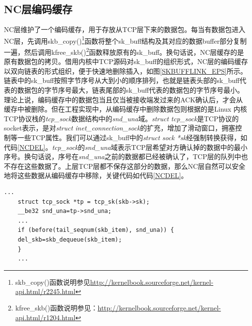 \subsection{NC层编码缓存}
NC层维护了一个编码缓存，用于存放从TCP层下来的数据包。每当有数据包进入NC层，先调用skb\_copy()\footnote{skb\_copy()函数说明参见\url{http://kernelbook.sourceforge.net/kernel-api.html/r2245.html}}函数将整个sk\_buff结构及其对应的数据buffer部分复制一遍，然后调用kfree\_skb()\footnote{kfree\_skb()函数说明参见：\url{http://kernelbook.sourceforge.net/kernel-api.html/r1204.html}}函数释放原有的sk\_buff。换句话说，NC层缓存的是原有数据包的拷贝。借用内核中TCP源码对sk\_buff的组织形式，NC层的编码缓存以双向链表的形式组织，便于快速地删除插入，如图\ref{SKBUFFLINK_EPS}所示。链表中的sk\_buff按照字节序号从大到小的顺序排列，也就是链表头部的sk\_buff代表的数据包的字节序号最大，链表尾部的sk\_buff代表的数据包的字节序号最小。理论上说，编码缓存中的数据包当且仅当被接收端发过来的ACK确认后，才会从缓存中被删除。但在工程实现中，从编码缓存中删除数据包则根据的是Linux 内核TCP协议栈的\emph{tcp\_sock}数据结构中的\emph{snd\_una}域。\emph{struct tcp\_sock}是TCP协议的socket表示，是对\emph{struct inet\_connection\_sock}的扩充，增加了滑动窗口，拥塞控制等一些TCP属性。我们可以通过sk\_buff中的\emph{struct sock *sk}经强制转换获得，如代码\ref{NCDEL}。\emph{tcp\_sock}的\emph{snd\_una}域表示TCP层希望对方确认掉的数据中的最小序号。换句话说，序号在\emph{snd\_una}之前的数据都已经被确认了，TCP层的队列中也不存在这些数据了。上层TCP层都不保存这部分的数据，那么NC层自然可以安全地将这些数据从编码缓存中移除，关键代码如代码\ref{NCDEL}。

	\begin{lstlisting}[float,caption=NC层编码缓存删包关键部分,label={NCDEL},language={[ANSI]C}]
	...
	struct tcp_sock *tp = tcp_sk(skb->sk);
	__be32 snd_una=tp->snd_una;
	...
	if (before(tail_seqnum(skb_item), snd_una)) {
	del_skb=skb_dequeue(skb_item);
	}
	...
	\end{lstlisting}

